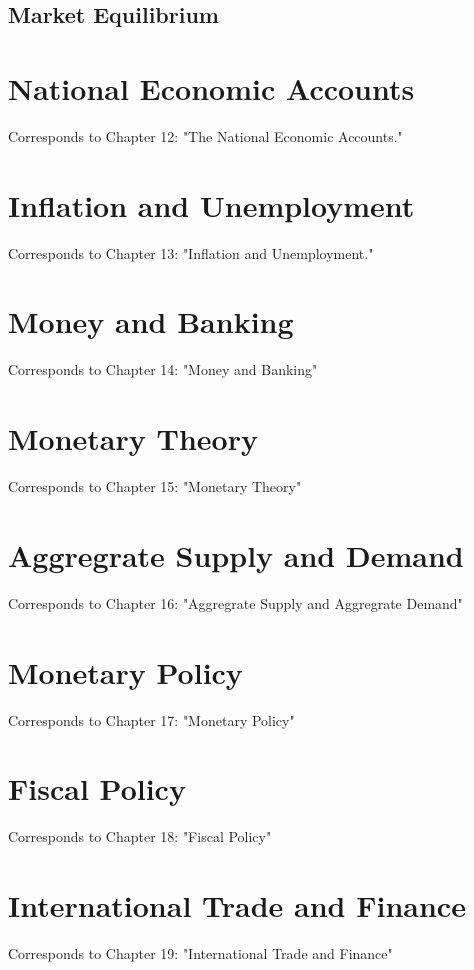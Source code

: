 \documentclass[12pt, a4paper]{article}
\theoremstyle{definition}
\begin{document}
\subsection{Market Equilibrium}

\newpage

\section{National Economic Accounts}
Corresponds to Chapter 12: "The National Economic Accounts."

\newpage

\section{Inflation and Unemployment}
Corresponds to Chapter 13: "Inflation and Unemployment."

\newpage

\section{Money and Banking}
Corresponds to Chapter 14: "Money and Banking"

\newpage

\section{Monetary Theory}
Corresponds to Chapter 15: "Monetary Theory"

\newpage

\section{Aggregrate Supply and Demand}
Corresponds to Chapter 16: "Aggregrate Supply and Aggregrate Demand"

\newpage

\section{Monetary Policy}
Corresponds to Chapter 17: "Monetary Policy"

\newpage

\section{Fiscal Policy}
Corresponds to Chapter 18: "Fiscal Policy"

\newpage

\section{International Trade and Finance}
Corresponds to Chapter 19: "International Trade and Finance"

\newpage
\end{document}
